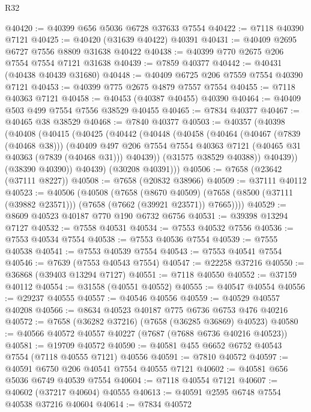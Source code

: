 \begin{lexlean}{R32}
\begin{coremodule}
@40420 := @40399 @656 @5036 @6728 @37633 @7554
@40422 := @7118 @40390 @7121
@40425 := @40420 (@31639 @40422) @40391
@40431 := @40409 @2695 @6727 @7556 @8809 @31638 @40422
@40438 := @40399 @770 @2675 @206 @7554 @7554 @7121 @31638
@40439 := @7859 @40377
@40442 := @40431 (@40438 @40439 @31680)
@40448 := @40409 @6725 @206 @7559 @7554 @40390 @7121
@40453 := @40399 @775 @2675 @4879 @7557 @7554
@40455 := @7118 @40363 @7121
@40458 := @40453 (@40387 @40455) @40390
@40464 := @40409 @503 @499 @7554 @7556 @38529 @40455
@40465 := @7834 @40377
@40467 := @40465 @38 @38529
@40468 := @7840 @40377
@40503 := @40357
    (@40398
      (@40408
        (@40415
          (@40425
            (@40442
              (@40448
                (@40458
                  (@40464
                    (@40467 (@7839 (@40468 @38)))
                    (@40409
                      @497
                      @206
                      @7554
                      @7554
                      @40363
                      @7121
                      (@40465 @31 @40363 (@7839 (@40468 @31)))
                      @40439))
                  (@31575 @38529 @40388))
                @40439))
            (@38390 @40390))
          @40439)
        (@30208 @40391)))
@40506 := @7658 (@23642 (@37111 @8227))
@40508 := @7658 (@20832 @38966)
@40509 := @37111 @40112
@40523 := @40506
    (@40508
      (@7658
        (@8670 @40509)
        (@7658 (@8500 (@37111 (@39882 @23571))) (@7658 (@7662 (@39921 @23571)) @7665))))
@40529 := @8609 @40523 @40187 @770 @190 @6732 @6756
@40531 := @39398 @13294 @7127
@40532 := @7558 @40531
@40534 := @7553 @40532 @7556
@40536 := @7553 @40534 @7554
@40538 := @7553 @40536 @7554
@40539 := @7555 @40538
@40541 := @7553 @40539 @7554
@40543 := @7553 @40541 @7554
@40546 := @7639 (@7553 @40543 @7554)
@40547 := @22258 @37216
@40550 := @36868 (@39403 @13294 @7127)
@40551 := @7118 @40550
@40552 := @37159 @40112
@40554 := @31558 (@40551 @40552)
@40555 := @40547 @40554
@40556 := @29237 @40555
@40557 := @40546 @40556
@40559 := @40529 @40557 @40208
@40566 := @8634 @40523 @40187 @775 @6736 @6753 @476 @40216
@40572 := @7658 (@36282 @37216) (@7658 (@36285 @36869) @40523)
@40580 := @40566 @40572 @40557 @40227 (@7687 (@7688 @6736 @40216 @40523))
@40581 := @19709 @40572
@40590 := @40581 @455 @6652 @6752 @40543 @7554 (@7118 @40555 @7121) @40556
@40591 := @7810 @40572
@40597 := @40591 @6750 @206 @40541 @7554 @40555 @7121
@40602 := @40581 @656 @5036 @6749 @40539 @7554
@40604 := @7118 @40554 @7121
@40607 := @40602 (@37217 @40604) @40555
@40613 := @40591 @2595 @6748 @7554 @40538 @37216 @40604
@40614 := @7834 @40572

\end{coremodule}
\end{lexlean}

